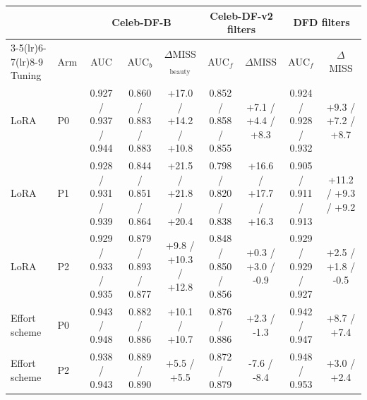 \begin{tabular}{@{}ll ccc cc cc@{}}
\toprule
 & & \multicolumn{3}{c}{Celeb-DF-B} & \multicolumn{2}{c}{Celeb-DF-v2 filters} & \multicolumn{2}{c}{DFD filters} \\
\cmidrule(lr){3-5}\cmidrule(lr){6-7}\cmidrule(lr){8-9}
Tuning & Arm & AUC & AUC$_b$ & $\Delta$MISS$_\text{beauty}$ & AUC$_f$ & $\Delta$MISS & AUC$_f$ & $\Delta$MISS \\
\midrule
LoRA & P0 & 0.927 / 0.937 / 0.944 & 0.860 / 0.883 / 0.883 & +17.0 / +14.2 / +10.8 & 0.852 / 0.858 / 0.855 & +7.1 / +4.4 / +8.3 & 0.924 / 0.928 / 0.932 & +9.3 / +7.2 / +8.7 \\
LoRA & P1 & 0.928 / 0.931 / 0.939 & 0.844 / 0.851 / 0.864 & +21.5 / +21.8 / +20.4 & 0.798 / 0.820 / 0.838 & +16.6 / +17.7 / +16.3 & 0.905 / 0.911 / 0.913 & +11.2 / +9.3 / +9.2 \\
LoRA & P2 & 0.929 / 0.933 / 0.935 & 0.879 / 0.893 / 0.877 & +9.8 / +10.3 / +12.8 & 0.848 / 0.850 / 0.856 & +0.3 / +3.0 / -0.9 & 0.929 / 0.929 / 0.927 & +2.5 / +1.8 / -0.5 \\
\midrule
Effort scheme & P0 & 0.943 / 0.948 & 0.882 / 0.886 & +10.1 / +10.7 & 0.876 / 0.886 & +2.3 / -1.3 & 0.942 / 0.947 & +8.7 / +7.4 \\
Effort scheme & P2 & 0.938 / 0.943 & 0.889 / 0.890 & +5.5 / +5.5 & 0.872 / 0.879 & -7.6 / -8.4 & 0.948 / 0.953 & +3.0 / +2.4 \\
\bottomrule
\end{tabular}
